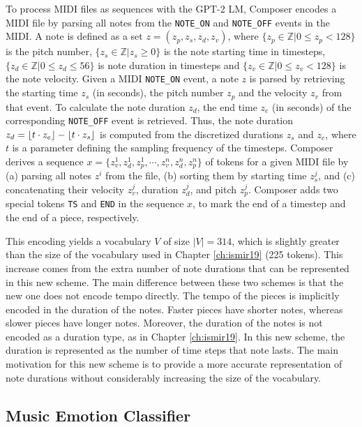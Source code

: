 To process MIDI files as sequences with the GPT-2 LM, Composer encodes a MIDI file by parsing all notes from the \texttt{NOTE\_ON} and \texttt{NOTE\_OFF} events in the MIDI. A note is defined as a set $z = (z_p, z_s, z_d, z_v)$, where $\{z_p \in \mathbb{Z} \vert 0 \leq z_p < 128 \}$ is the pitch number, $\{z_s \in \mathbb{Z} \vert z_s \geq 0 \}$ is the note starting time in timesteps,  $\{z_d \in \mathbb{Z} \vert 0 \leq z_d \leq 56\}$ is note duration in timesteps and $\{z_v \in \mathbb{Z} \vert 0 \leq z_v < 128 \}$ is the note velocity. Given a MIDI \texttt{NOTE\_ON} event, a note $z$ is parsed by retrieving the starting time $z_s$ (in seconds), the pitch number $z_p$ and the velocity $z_v$ from that event. To calculate the note duration $z_d$, the end time $z_e$ (in seconds) of the corresponding \texttt{NOTE\_OFF} event is retrieved. Thus, the note duration $z_d = \lfloor t \cdot z_e\rfloor - \lfloor t \cdot z_s\rfloor$ is computed from the  discretized durations $z_s$ and $z_e$, where $t$ is a parameter defining the sampling frequency of the timesteps. Composer derives a sequence $x = \{z_v^1, z_{d}^1, z_{p}^1, \cdots, z_v^n, z_{d}^n, z_p^n\}$ of tokens for a given MIDI file by (a) parsing all notes $z^i$ from the file, (b) sorting them by starting time $z_s^j$, and (c) concatenating their velocity $z_v^j$, duration $z_d^j$, and pitch $z_p^j$. Composer adds two special tokens \texttt{TS} and \texttt{END} in the sequence $x$, to mark the end of a timestep and the end of a piece, respectively.

This encoding yields a vocabulary $V$ of size $|V| = 314$, which is slightly greater than the size of the vocabulary used in Chapter \ref{ch:ismir19} (225 tokens). This increase comes from the extra number of note durations that can be represented in this new scheme. The main difference between these two schemes is that the new one does not encode tempo directly. The tempo of the pieces is implicitly encoded in the duration of the notes. Faster pieces have shorter notes, whereas slower pieces have longer notes. Moreover, the duration of the notes is not encoded as a duration type, as in Chapter \ref{ch:ismir19}. In this new scheme, the duration is represented as the number of time steps that note lasts. The main motivation for this new scheme is to provide a more accurate representation of note durations without considerably increasing the size of the vocabulary.

\subsection{Music Emotion Classifier}


